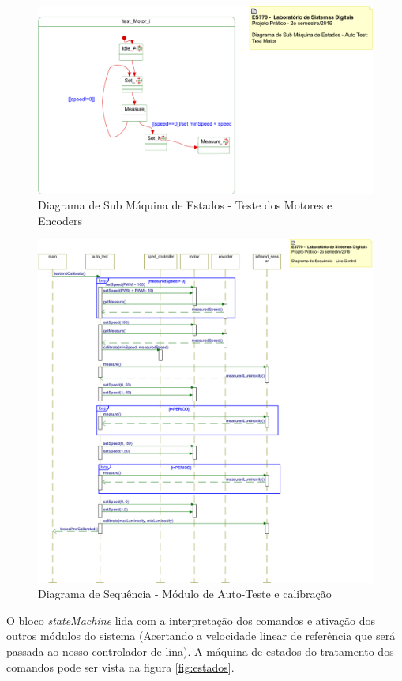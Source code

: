 \documentclass{article}
\begin{document}
\begin{figure}[H]
	\centering
	\includegraphics[width=0.9\linewidth]{testMotor}
	\caption{Diagrama de Sub Máquina de Estados - Teste dos Motores e Encoders}
	\label{fig:testMotor}
\end{figure}
\begin{figure}[H]
	\centering
	\includegraphics[width=0.9\linewidth]{testes}
	\caption{Diagrama de Sequência - Módulo de Auto-Teste e calibração}
	\label{fig:testes}
\end{figure}

O bloco \textit{stateMachine} lida com a interpretação dos comandos e ativação dos outros módulos do sistema (Acertando a velocidade linear de referência que será passada ao nosso controlador de lina). A máquina de estados do tratamento dos comandos pode ser vista na figura \ref{fig:estados}.
\end{document}
